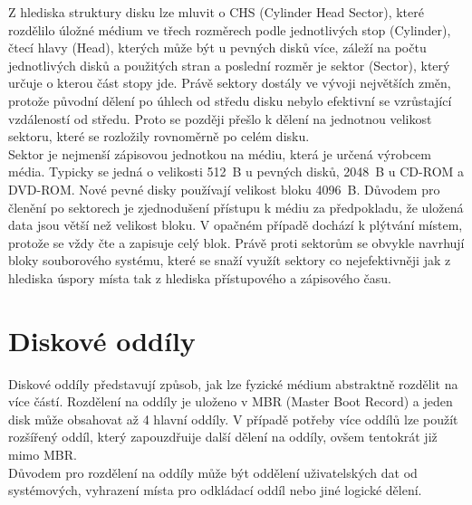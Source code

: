 Z hlediska struktury disku lze mluvit o CHS (Cylinder Head Sector), které rozdělilo úložné médium ve třech rozměrech podle jednotlivých stop (Cylinder), čtecí hlavy (Head), kterých může být u pevných disků více, záleží na počtu jednotlivých disků a použitých stran a poslední rozměr je sektor (Sector), který určuje o kterou část stopy jde. Právě sektory dostály ve vývoji největších změn, protože původní dělení po úhlech od středu disku nebylo efektivní se vzrůstající vzdáleností od středu. Proto se později přešlo k dělení na jednotnou velikost sektoru, které se rozložily rovnoměrně po celém disku.\\
Sektor je nejmenší zápisovou jednotkou na médiu, která je určená výrobcem média. Typicky se jedná o velikosti 512~B u pevných disků, 2048~B u CD-ROM a DVD-ROM. Nové pevné disky používají velikost bloku 4096~B. Důvodem pro členění po sektorech je zjednodušení přístupu k médiu za předpokladu, že uložená data jsou větší než velikost bloku. V opačném případě dochází k plýtvání místem, protože se vždy čte a zapisuje celý blok. Právě proti sektorům se obvykle navrhují bloky souborového systému, které se snaží využít sektory co nejefektivněji jak z hlediska úspory místa tak z hlediska přístupového a zápisového času.\\

\section{Diskové oddíly}
Diskové oddíly představují způsob, jak lze fyzické médium abstraktně rozdělit na více částí. Rozdělení na oddíly je uloženo v MBR (Master Boot Record) a jeden disk může obsahovat až 4 hlavní oddíly. V případě potřeby více oddílů lze použít rozšířený oddíl, který zapouzdřuije další dělení na oddíly, ovšem tentokrát již mimo MBR.\\
Důvodem pro rozdělení na oddíly může být oddělení uživatelských dat od systémových, vyhrazení místa pro odkládací oddíl nebo jiné logické dělení. 

